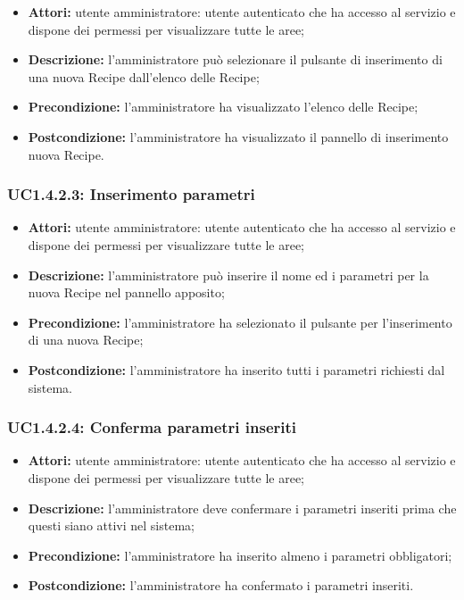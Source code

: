 \begin{itemize}
   	\item \textbf{Attori:} utente amministratore: utente autenticato che ha accesso al servizio e dispone dei permessi per visualizzare tutte le aree;
    \item \textbf{Descrizione:} l'amministratore può selezionare il pulsante di inserimento di una nuova Recipe dall'elenco delle Recipe;
    \item \textbf{Precondizione:} l'amministratore ha visualizzato l'elenco delle Recipe;
    \item \textbf{Postcondizione:} l'amministratore ha visualizzato il pannello di inserimento nuova Recipe.
\end{itemize}

\subsubsection{UC1.4.2.3: Inserimento parametri}

\begin{itemize}
   	\item \textbf{Attori:} utente amministratore: utente autenticato che ha accesso al servizio e dispone dei permessi per visualizzare tutte le aree;
    \item \textbf{Descrizione:} l'amministratore può inserire il nome ed i parametri per la nuova Recipe nel pannello apposito;
    \item \textbf{Precondizione:} l'amministratore ha selezionato il pulsante per l'inserimento di una nuova Recipe;
    \item \textbf{Postcondizione:} l'amministratore ha inserito tutti i parametri richiesti dal sistema.
\end{itemize}

\subsubsection{UC1.4.2.4: Conferma parametri inseriti}

\begin{itemize}
  	\item \textbf{Attori:} utente amministratore: utente autenticato che ha accesso al servizio e dispone dei permessi per visualizzare tutte le aree;
    \item \textbf{Descrizione:} l'amministratore deve confermare i parametri inseriti prima che questi siano attivi nel sistema;
    \item \textbf{Precondizione:} l'amministratore ha inserito almeno i parametri obbligatori;
    \item \textbf{Postcondizione:} l'amministratore ha confermato i parametri inseriti.
\end{itemize}

